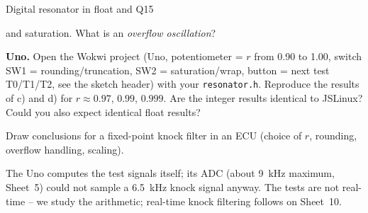 \begin{exercise}{Digital resonator in float and Q15}{\Wokwi\ \JSLinux}
\begin{tasks}
    and saturation. What is an \emph{overflow oscillation}?
  \item \textbf{Uno.} Open the Wokwi project (Uno, potentiometer = $r$ from
    0.90 to 1.00, switch SW1 = rounding/truncation, SW2 =
    saturation/wrap, button = next test T0/T1/T2, see the sketch header) with
    your \texttt{resonator.h}. Reproduce the results of c) and d) for
    $r\approx0.97$, $0.99$, $0.999$. Are the integer results identical to
    JSLinux? Could you also expect identical float results?
  \item Draw conclusions for a fixed-point knock filter in an ECU (choice of
    $r$, rounding, overflow handling, scaling).
\end{tasks}
\begin{hint}
\hinttext The Uno computes the test signals itself; its ADC (about
\SI{9}{kHz} maximum, Sheet~5) could not sample a \SI{6.5}{kHz} knock signal
anyway. The tests are not real-time -- we study the arithmetic; real-time
knock filtering follows on Sheet~10.
\end{hint}
\end{exercise}

